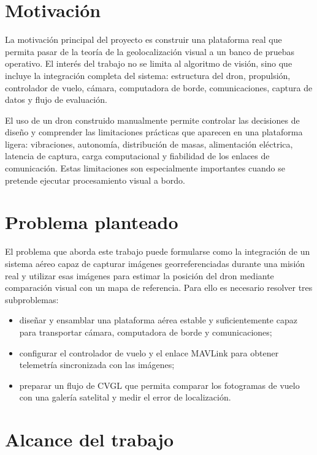 \section{Motivación}
\label{sec:introduccion-motivacion}

La motivación principal del proyecto es construir una plataforma real que permita pasar de la teoría de la geolocalización visual a un banco de pruebas operativo. El interés del trabajo no se limita al algoritmo de visión, sino que incluye la integración completa del sistema: estructura del dron, propulsión, controlador de vuelo, cámara, computadora de borde, comunicaciones, captura de datos y flujo de evaluación.

El uso de un dron construido manualmente permite controlar las decisiones de diseño y comprender las limitaciones prácticas que aparecen en una plataforma ligera: vibraciones, autonomía, distribución de masas, alimentación eléctrica, latencia de captura, carga computacional y fiabilidad de los enlaces de comunicación. Estas limitaciones son especialmente importantes cuando se pretende ejecutar procesamiento visual a bordo.

\section{Problema planteado}
\label{sec:introduccion-problema}

El problema que aborda este trabajo puede formularse como la integración de un sistema aéreo capaz de capturar imágenes georreferenciadas durante una misión real y utilizar esas imágenes para estimar la posición del dron mediante comparación visual con un mapa de referencia. Para ello es necesario resolver tres subproblemas:

\begin{itemize}
\item diseñar y ensamblar una plataforma aérea estable y suficientemente capaz para transportar cámara, computadora de borde y comunicaciones;
\item configurar el controlador de vuelo y el enlace MAVLink para obtener telemetría sincronizada con las imágenes;
\item preparar un flujo de CVGL que permita comparar los fotogramas de vuelo con una galería satelital y medir el error de localización.
\end{itemize}

\section{Alcance del trabajo}
\label{sec:introduccion-alcance}


